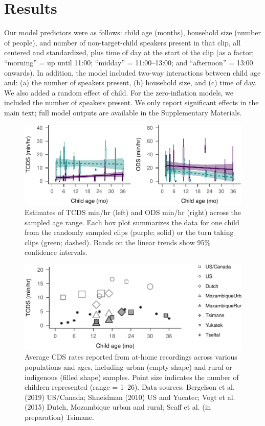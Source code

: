 \documentclass[floatsintext,man]{apa6}
\theoremstyle{definition}
\theoremstyle{definition}
\theoremstyle{definition}
\theoremstyle{remark}
\begin{document}
\section{Results}\label{results}

Our model predictors were as follows: child age (months), household size
(number of people), and number of non-target-child speakers present in
that clip, all centered and standardized, plus time of day at the start
of the clip (as a factor; \enquote{morning} = up until 11:00;
\enquote{midday} = 11:00--13:00; and \enquote{afternoon} = 13:00
onwards). In addition, the model included two-way interactions between
child age and: (a) the number of speakers present, (b) household size,
and (c) time of day. We also added a random effect of child. For the
zero-inflation models, we included the number of speakers present. We
only report significant effects in the main text; full model outputs are
available in the Supplementary Materials.

\begin{figure}
\centering
\includegraphics{Tseltal-CLE_files/figure-latex/fig3-1.pdf}
\caption{\label{fig:fig3}Estimates of TCDS min/hr (left) and ODS min/hr
(right) across the sampled age range. Each box plot summarizes the data
for one child from the randomly sampled clips (purple; solid) or the
turn taking clips (green; dashed). Bands on the linear trends show 95\%
confidence intervals.}
\end{figure}

\begin{figure}
\centering
\includegraphics{Tseltal-CLE_files/figure-latex/fig4-1.pdf}
\caption{\label{fig:fig4}Average CDS rates reported from at-home recordings
across various populations and ages, including urban (empty shape) and
rural or indigenous (filled shape) samples. Point size indicates the
number of children represented (range = 1--26). Data sources: Bergelson
et al. (2019) US/Canada; Shneidman (2010) US and Yucatec; Vogt et al.
(2015) Dutch, Mozambique urban and rural; Scaff et al. (in preparation)
Tsimane.}
\end{figure}
\end{document}
